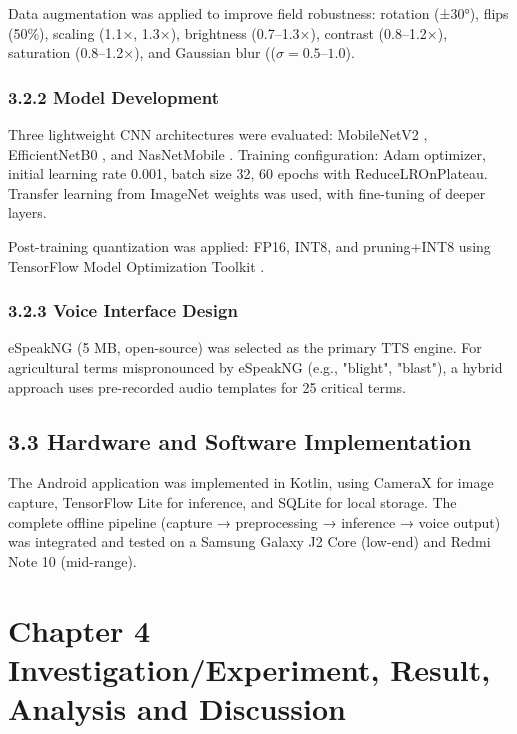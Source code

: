 \documentclass[12pt,letterpaper]{report}
\begin{document}
Data augmentation was applied to improve field robustness: rotation (±30°), flips (50\%), scaling (1.1×, 1.3×), brightness (0.7–1.3×), contrast (0.8–1.2×), saturation (0.8–1.2×), and Gaussian blur (($\sigma=0.5–1.0$).

\subsection*{3.2.2 Model Development}
Three lightweight CNN architectures were evaluated: MobileNetV2 \cite{ref2}, EfficientNetB0 \cite{ref3}, and NasNetMobile \cite{ref4}. Training configuration: Adam optimizer, initial learning rate 0.001, batch size 32, 60 epochs with ReduceLROnPlateau. Transfer learning from ImageNet weights was used, with fine-tuning of deeper layers.

Post-training quantization was applied: FP16, INT8, and pruning+INT8 using TensorFlow Model Optimization Toolkit \cite{ref9}.

\subsection*{3.2.3 Voice Interface Design}
eSpeakNG (5 MB, open-source) was selected as the primary TTS engine. For agricultural terms mispronounced by eSpeakNG (e.g., "blight", "blast"), a hybrid approach uses pre-recorded audio templates for 25 critical terms.

\section*{3.3 Hardware and Software Implementation}

The Android application was implemented in Kotlin, using CameraX for image capture, TensorFlow Lite for inference, and SQLite for local storage. The complete offline pipeline (capture → preprocessing → inference → voice output) was integrated and tested on a Samsung Galaxy J2 Core (low-end) and Redmi Note 10 (mid-range).

\chapter*{Chapter 4 Investigation/Experiment, Result, Analysis and Discussion}
\end{document}
